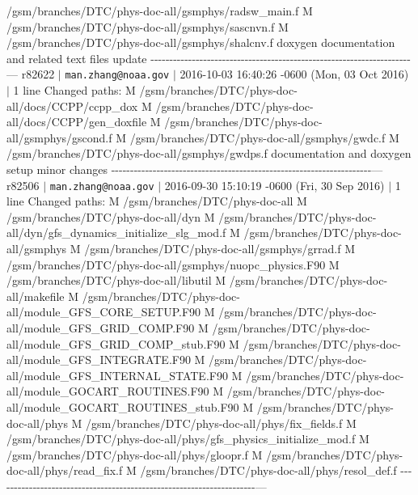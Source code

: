 \begin{DoxyItemize}
/gsm/branches/\+D\+T\+C/phys-\/doc-\/all/gsmphys/radsw\+\_\+main.f M /gsm/branches/\+D\+T\+C/phys-\/doc-\/all/gsmphys/sascnvn.f M /gsm/branches/\+D\+T\+C/phys-\/doc-\/all/gsmphys/shalcnv.f doxygen documentation and related text files update -\/-\/-\/-\/-\/-\/-\/-\/-\/-\/-\/-\/-\/-\/-\/-\/-\/-\/-\/-\/-\/-\/-\/-\/-\/-\/-\/-\/-\/-\/-\/-\/-\/-\/-\/-\/-\/-\/-\/-\/-\/-\/-\/-\/-\/-\/-\/-\/-\/-\/-\/-\/-\/-\/-\/-\/-\/-\/-\/-\/-\/-\/-\/-\/-\/-\/-\/-\/-\/--- r82622 $\vert$ {\tt man.\+zhang@noaa.\+gov} $\vert$ 2016-\/10-\/03 16\+:40\+:26 -\/0600 (Mon, 03 Oct 2016) $\vert$ 1 line Changed paths\+: M /gsm/branches/\+D\+T\+C/phys-\/doc-\/all/docs/\+C\+C\+P\+P/ccpp\+\_\+dox M /gsm/branches/\+D\+T\+C/phys-\/doc-\/all/docs/\+C\+C\+P\+P/gen\+\_\+doxfile M /gsm/branches/\+D\+T\+C/phys-\/doc-\/all/gsmphys/gscond.f M /gsm/branches/\+D\+T\+C/phys-\/doc-\/all/gsmphys/gwdc.f M /gsm/branches/\+D\+T\+C/phys-\/doc-\/all/gsmphys/gwdps.f documentation and doxygen setup minor changes -\/-\/-\/-\/-\/-\/-\/-\/-\/-\/-\/-\/-\/-\/-\/-\/-\/-\/-\/-\/-\/-\/-\/-\/-\/-\/-\/-\/-\/-\/-\/-\/-\/-\/-\/-\/-\/-\/-\/-\/-\/-\/-\/-\/-\/-\/-\/-\/-\/-\/-\/-\/-\/-\/-\/-\/-\/-\/-\/-\/-\/-\/-\/-\/-\/-\/-\/-\/-\/--- r82506 $\vert$ {\tt man.\+zhang@noaa.\+gov} $\vert$ 2016-\/09-\/30 15\+:10\+:19 -\/0600 (Fri, 30 Sep 2016) $\vert$ 1 line Changed paths\+: M /gsm/branches/\+D\+T\+C/phys-\/doc-\/all M /gsm/branches/\+D\+T\+C/phys-\/doc-\/all/dyn M /gsm/branches/\+D\+T\+C/phys-\/doc-\/all/dyn/gfs\+\_\+dynamics\+\_\+initialize\+\_\+slg\+\_\+mod.f M /gsm/branches/\+D\+T\+C/phys-\/doc-\/all/gsmphys M /gsm/branches/\+D\+T\+C/phys-\/doc-\/all/gsmphys/grrad.f M /gsm/branches/\+D\+T\+C/phys-\/doc-\/all/gsmphys/nuopc\+\_\+physics.F90 M /gsm/branches/\+D\+T\+C/phys-\/doc-\/all/libutil M /gsm/branches/\+D\+T\+C/phys-\/doc-\/all/makefile M /gsm/branches/\+D\+T\+C/phys-\/doc-\/all/module\+\_\+\+G\+F\+S\+\_\+\+C\+O\+R\+E\+\_\+\+S\+E\+T\+UP.F90 M /gsm/branches/\+D\+T\+C/phys-\/doc-\/all/module\+\_\+\+G\+F\+S\+\_\+\+G\+R\+I\+D\+\_\+\+C\+O\+MP.F90 M /gsm/branches/\+D\+T\+C/phys-\/doc-\/all/module\+\_\+\+G\+F\+S\+\_\+\+G\+R\+I\+D\+\_\+\+C\+O\+M\+P\+\_\+stub.F90 M /gsm/branches/\+D\+T\+C/phys-\/doc-\/all/module\+\_\+\+G\+F\+S\+\_\+\+I\+N\+T\+E\+G\+R\+A\+TE.F90 M /gsm/branches/\+D\+T\+C/phys-\/doc-\/all/module\+\_\+\+G\+F\+S\+\_\+\+I\+N\+T\+E\+R\+N\+A\+L\+\_\+\+S\+T\+A\+TE.F90 M /gsm/branches/\+D\+T\+C/phys-\/doc-\/all/module\+\_\+\+G\+O\+C\+A\+R\+T\+\_\+\+R\+O\+U\+T\+I\+N\+ES.F90 M /gsm/branches/\+D\+T\+C/phys-\/doc-\/all/module\+\_\+\+G\+O\+C\+A\+R\+T\+\_\+\+R\+O\+U\+T\+I\+N\+E\+S\+\_\+stub.F90 M /gsm/branches/\+D\+T\+C/phys-\/doc-\/all/phys M /gsm/branches/\+D\+T\+C/phys-\/doc-\/all/phys/fix\+\_\+fields.f M /gsm/branches/\+D\+T\+C/phys-\/doc-\/all/phys/gfs\+\_\+physics\+\_\+initialize\+\_\+mod.f M /gsm/branches/\+D\+T\+C/phys-\/doc-\/all/phys/gloopr.f M /gsm/branches/\+D\+T\+C/phys-\/doc-\/all/phys/read\+\_\+fix.f M /gsm/branches/\+D\+T\+C/phys-\/doc-\/all/phys/resol\+\_\+def.f -\/-\/-\/-\/-\/-\/-\/-\/-\/-\/-\/-\/-\/-\/-\/-\/-\/-\/-\/-\/-\/-\/-\/-\/-\/-\/-\/-\/-\/-\/-\/-\/-\/-\/-\/-\/-\/-\/-\/-\/-\/-\/-\/-\/-\/-\/-\/-\/-\/-\/-\/-\/-\/-\/-\/-\/-\/-\/-\/-\/-\/-\/-\/-\/-\/-\/-\/-\/-\/--- 
\end{DoxyItemize}